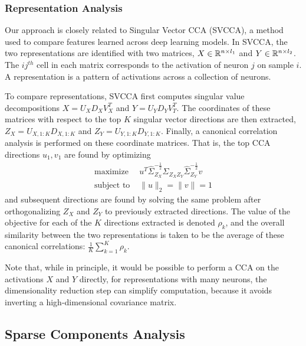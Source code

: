 \subsubsection{Representation Analysis}

Our approach is closely related to Singular Vector CCA (SVCCA), a method used to
compare features learned across deep learning models. In SVCCA, the two
representations are identified with two matrices, $X \in \mathbb{R}^{n \times
  l_{1}}$ and $Y \in \mathbb{R}^{n \times l_{2}}$. The $ij^{th}$ cell in each matrix
corresponds to the activation of neuron $j$ on sample $i$. A representation is a
pattern of activations across a collection of neurons.

To compare representations, SVCCA first computes singular value decompositions
$X = U_{X}D_{X}V_{X}^{T}$ and $Y = U_{Y}D_{Y}V_{T}^{T}$. The coordinates of
these matrices with respect to the top $K$ singular vector directions are then
extracted, $Z_{X} = U_{X, 1:K}D_{X, 1:K}$ and $Z_{Y} = U_{Y, 1:K}D_{Y, 1:K}$.
Finally, a canonical correlation analysis is performed on these coordinate
matrices. That is, the top CCA directions $u_{1}, v_{1}$ are found by optimizing
\begin{align*}
  \text{maximize }& u^{T}\hat{\Sigma}_{Z_{X}}^{-\frac{1}{2}}\hat{\Sigma}_{Z_{X}Z_{Y}}\hat{\Sigma}_{Z_{Y}}^{-\frac{1}{2}}v \\
  \text{subject to } & \|u\|_{2} = \|v\| = 1
\end{align*}
and subsequent directions are found by solving the same problem after
orthogonalizing $Z_{X}$ and $Z_{Y}$ to previously extracted directions. The
value of the objective for each of the $K$ directions extracted is denoted
$\rho_{k}$, and the overall similarity between the two representations is taken
to be the average of these canonical correlations: $\frac{1}{K}\sum_{k = 1}^{K}
\rho_{k}$.

Note that, while in principle, it would be possible to perform a CCA on the
activations $X$ and $Y$ directly, for representations with many neurons, the
dimensionality reduction step can simplify computation, because it avoids
inverting a high-dimensional covariance matrix.

\subsection{Sparse Components Analysis}

